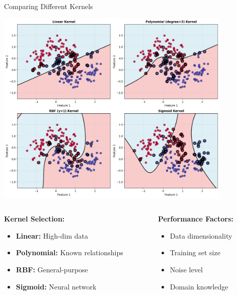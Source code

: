 \documentclass[8pt,aspectratio=1610]{beamer}
\begin{document}
\begin{frame}{Comparing Different Kernels}
\begin{center}
\includegraphics[width=0.85\textwidth]{../figures/different_kernels.png}
\end{center}

\begin{columns}[t]
\begin{column}{0.48\textwidth}
\textbf{Kernel Selection:}
\begin{itemize}
\setlength{\itemsep}{0pt}
\item \textbf{Linear:} High-dim data
\item \textbf{Polynomial:} Known relationships
\item \textbf{RBF:} General-purpose
\item \textbf{Sigmoid:} Neural network
\end{itemize}
\end{column}

\begin{column}{0.48\textwidth}
\textbf{Performance Factors:}
\begin{itemize}
\setlength{\itemsep}{0pt}
\item Data dimensionality
\item Training set size
\item Noise level
\item Domain knowledge
\end{itemize}
\end{column}
\end{columns}
\end{frame}
\end{document}
